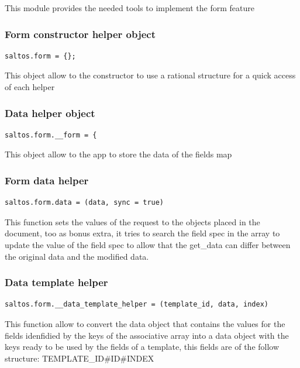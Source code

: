 \documentclass[a4paper]{article}
\begin{document}
This module provides the needed tools to implement the form feature

\hypertarget{toc217}{}
\subsubsection{Form constructor helper object}

\begin{lstlisting}
saltos.form = {};
\end{lstlisting}

This object allow to the constructor to use a rational structure for a quick access of each
helper

\hypertarget{toc218}{}
\subsubsection{Data helper object}

\begin{lstlisting}
saltos.form.__form = {
\end{lstlisting}

This object allow to the app to store the data of the fields map

\hypertarget{toc219}{}
\subsubsection{Form data helper}

\begin{lstlisting}
saltos.form.data = (data, sync = true)
\end{lstlisting}

This function sets the values of the request to the objects placed in the document, too as bonus
extra, it tries to search the field spec in the array to update the value of the field spec to
allow that the get\_data can differ between the original data and the modified data.

\hypertarget{toc220}{}
\subsubsection{Data template helper}

\begin{lstlisting}
saltos.form.__data_template_helper = (template_id, data, index)
\end{lstlisting}

This function allow to convert the data object that contains the values for the fields idenfidied
by the keys of the associative array into a data object with the keys ready to be used by the
fields of a template, this fields are of the follow structure: TEMPLATE\_ID\#ID\#INDEX
\end{document}

